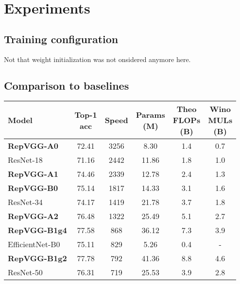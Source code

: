 \section{Experiments} \label{experiments}

\subsection{Training configuration}

Not that weight initialization was not onsidered anymore here. 

\subsection{Comparison to baselines}

\setlength{\tabcolsep}{5pt}
\begin{table}
	\begin{center}
		\begin{tabular}{lccccc} 
			\hline
			\parbox[c][1.5cm]{0.7cm}{\centering Model} & \parbox[c][1.5cm]{0.9cm}{\centering Top-1\\acc} & \parbox[c][1.5cm]{0.75cm}{\centering Speed} & \parbox[c][1.5cm]{0.75cm}{\centering Params\\(M)} & \parbox[c][1.5cm]{0.75cm}{\centering Theo\\FLOPs\\(B)} & \parbox[c][1.5cm]{0.75cm}{\centering Wino\\MULs\\(B)}\\
			\hline
			\textbf{RepVGG-A0} & 72.41 & 3256 & 8.30 & 1.4 & 0.7 \\
			ResNet-18 & 71.16 & 2442 & 11.86 & 1.8 & 1.0 \\
			\hline
			\textbf{RepVGG-A1} & 74.46 & 2339 & 12.78 & 2.4 & 1.3 \\
			\textbf{RepVGG-B0} & 75.14 & 1817 & 14.33 & 3.1 & 1.6 \\
			ResNet-34 & 74.17 & 1419 & 21.78 & 3.7 & 1.8 \\
			\hline
			\textbf{RepVGG-A2} & 76.48 & 1322 & 25.49 & 5.1 & 2.7 \\
			\textbf{RepVGG-B1g4} & 77.58 & 868 & 36.12 & 7.3 & 3.9 \\
			EfficientNet-B0 & 75.11 & 829 & 5.26 & 0.4 & - \\
			\hline
			\textbf{RepVGG-B1g2} & 77.78 & 792 & 41.36 & 8.8 & 4.6 \\
			ResNet-50 & 76.31 & 719 & 25.53 & 3.9 & 2.8 \\

\end{tabular}
\end{center}
\end{table}
